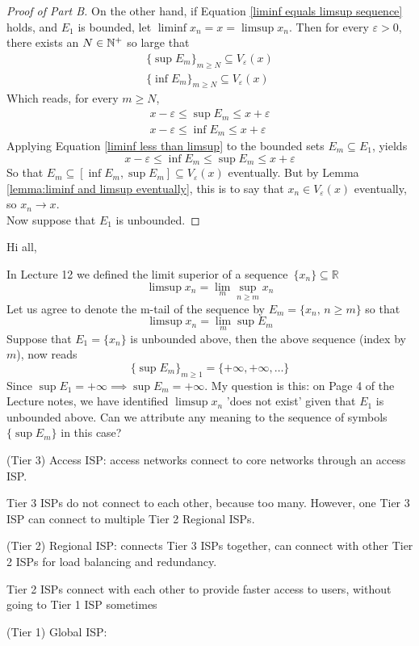 \documentclass[../../main.tex]{subfiles}
\begin{document}
\begin{proof}[Proof of Part B]
    On the other hand, if Equation \eqref{liminf equals limsup sequence} holds, and $E_1$ is bounded, let $\liminf x_n= x = \limsup x_n$. Then for every $\varepsilon>0$, there exists an $N\in\mathbb{N}^+$ so large that 
    \begin{align*}
    \{\sup E_m\}_{m\geq N}\subseteq V_\varepsilon(x)\\
    \{\inf E_m\}_{m\geq N}\subseteq V_\varepsilon(x)
    \end{align*}
    Which reads, for every $m\geq N$,
    \begin{align*}
    x-\varepsilon\leq \sup E_m\leq x+\varepsilon\\
    x-\varepsilon\leq \inf E_m\leq x+\varepsilon
    \end{align*}
    Applying Equation \eqref{liminf less than limsup} to the bounded sets $E_m\subseteq E_1$, yields
    \[
    x-\varepsilon\leq \inf E_m\leq \sup E_m\leq x+\varepsilon
    \]
    So that $E_m\subseteq[\inf E_m, \sup E_m]\subseteq  V_{\varepsilon}(x)$ eventually. But by Lemma \ref{lemma:liminf and limsup eventually}, this is to say that $x_n\in V_\varepsilon(x)$ eventually, so $x_n\to x$.\\
    
    Now suppose that $E_1$ is unbounded. 
\end{proof}
\newpage
Hi all,

In Lecture 12 we defined the limit superior of a sequence $\{x_n\}\subseteq\mathbb{R}$
\[
\limsup x_n = \lim_{m}\sup_{n\geq m} x_n
\]
Let us agree to denote the m-tail of the sequence by $E_m = \{x_n,\, n\geq m\}$ so that
\[
\limsup x_n = \lim_m \sup E_m
\]
Suppose that $E_1=\{x_n\}$ is unbounded above, then the above sequence (index by $m$), now reads
\[
\{\sup E_m\}_{m\geq 1}=\{+\infty,+\infty,\ldots\}
\]
Since $\sup E_1=+\infty\implies \sup E_m=+\infty$. My question is this: on Page 4 of the Lecture notes, we have identified $\limsup x_n$ 'does not exist' given that $E_1$ is unbounded above. Can we attribute any meaning to the sequence of symbols $\{\sup E_m\}$ in this case? 

\begin{wtr}
    \item (Tier 3) Access ISP: access networks connect to core networks through an access ISP. \item Tier 3 ISPs do not connect to each other, because too many. However, one Tier 3 ISP can connect to multiple Tier 2 Regional ISPs.
    \item (Tier 2) Regional ISP: connects Tier 3 ISPs together, can connect with other Tier 2 ISPs for load balancing and redundancy.
    \item Tier 2 ISPs connect with each other to provide faster access to users, without going to Tier 1 ISP sometimes
    \item (Tier 1) Global ISP: 
    
\end{wtr}
\end{document}
